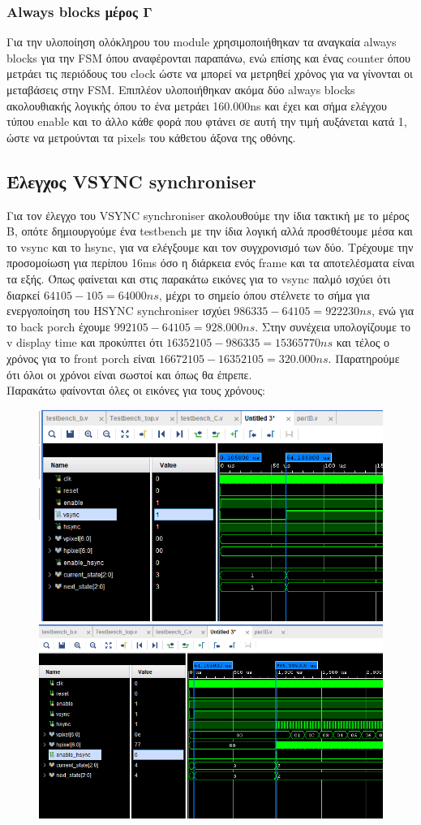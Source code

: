 \documentclass[12pt,a4paper]{article}
\begin{document}
	\subsubsection{Always blocks μέρος Γ}
	Για την υλοποίηση ολόκληρου του module χρησιμοποιήθηκαν τα αναγκαία always blocks για την FSM όπου αναφέρονται παραπάνω, ενώ επίσης και ένας counter όπου μετράει τις περιόδους του clock ώστε να μπορεί να μετρηθεί χρόνος για να γίνονται οι μεταβάσεις στην FSM. Επιπλέον υλοποιήθηκαν ακόμα δύο always blocks ακολουθιακής λογικής όπου το ένα μετράει 160.000ns και έχει και σήμα ελέγχου τύπου enable και το άλλο κάθε φορά που φτάνει σε αυτή την τιμή αυξάνεται κατά 1, ώστε να μετρούνται τα pixels του κάθετου άξονα της οθόνης. 
	
	\subsection{Έλεγχος VSYNC synchroniser}
	Για τον έλεγχο του VSYNC synchroniser ακολουθούμε την ίδια τακτική με το μέρος Β, οπότε δημιουργούμε ένα testbench με την ίδια λογική αλλά προσθέτουμε μέσα και το vsync και το hsync, για να ελέγξουμε και τον συγχρονισμό των δύο. Τρέχουμε την προσομοίωση για περίπου 16ms όσο η διάρκεια ενός frame και τα αποτελέσματα είναι τα εξής. Όπως φαίνεται και στις παρακάτω εικόνες για το vsync παλμό ισχύει ότι διαρκεί $64105 - 105 = 64000ns$, μέχρι το σημείο όπου στέλνετε το σήμα για ενεργοποίηση του HSYNC synchroniser  ισχύει $986335 - 64105 = 922230 ns$, ενώ για το back porch έχουμε $ 992105 - 64105 = 928.000 ns$. Στην συνέχεια υπολογίζουμε το v display time και προκύπτει ότι $ 16352105 - 986335 = 15365770 ns$ και τέλος ο χρόνος για το front porch είναι $16672105 - 16352105 = 320.000 ns$. Παρατηρούμε ότι όλοι οι χρόνοι είναι σωστοί και όπως θα έπρεπε.\\
	Παρακάτω φαίνονται όλες οι εικόνες για τους χρόνους:
	\begin{figure}[H]
		\centering
		\includegraphics[width=.4\linewidth]{pictures/palmos vsync time}
		\centering
		\includegraphics[width=.4\linewidth]{pictures/v back porch time}
	\end{figure}
\end{document}
